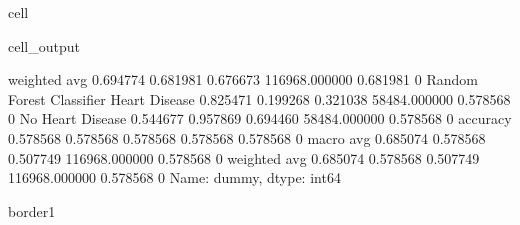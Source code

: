 \documentclass[letterpaper,10pt,english]{jupyterBook}
\begin{document}
\begin{sphinxuseclass}{cell}
\begin{sphinxVerbatimOutput}
\begin{sphinxuseclass}{cell_output}
\begin{sphinxVerbatim}[commandchars=\\\{\}]
                           weighted avg      0.694774   0.681981  0.676673  116968.000000  0.681981    0
Random Forest Classifier   Heart Disease     0.825471   0.199268  0.321038  58484.000000   0.578568    0
                           No Heart Disease  0.544677   0.957869  0.694460  58484.000000   0.578568    0
                           accuracy          0.578568   0.578568  0.578568  0.578568       0.578568    0
                           macro avg         0.685074   0.578568  0.507749  116968.000000  0.578568    0
                           weighted avg      0.685074   0.578568  0.507749  116968.000000  0.578568    0
Name: dummy, dtype: int64

border1
\PYGZhy{}\PYGZhy{}\PYGZhy{}\PYGZhy{}\PYGZhy{}\PYGZhy{}\PYGZhy{}\PYGZhy{}\PYGZhy{}\PYGZhy{}\PYGZhy{}\PYGZhy{}\PYGZhy{}\PYGZhy{}\PYGZhy{}\PYGZhy{}\PYGZhy{}\PYGZhy{}\PYGZhy{}
\end{sphinxVerbatim}

\noindent{}


\end{sphinxuseclass}
\end{sphinxVerbatimOutput}
\end{sphinxuseclass}
\end{document}
